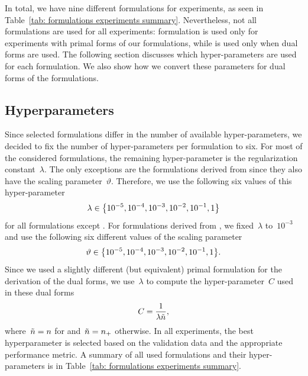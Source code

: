 In total, we have nine different formulations for experiments, as seen in Table~\ref{tab: formulations experiments summary}. Nevertheless, not all formulations are used for all experiments: \BaseLine formulation is used only for experiments with primal forms of our formulations, while \SVM is used only when dual forms are used. The following section discusses which hyper-parameters are used for each formulation. We also show how we convert these parameters for dual forms of the formulations.

\pagebreak

\subsection{Hyperparameters}

Since selected formulations differ in the number of available hyper-parameters, we decided to fix the number of hyper-parameters per formulation to six. For most of the considered formulations, the remaining hyper-parameter is the regularization constant~$\lambda$. The only exceptions are the formulations derived from \PatMatNP since they also have the scaling parameter~$\vartheta.$ Therefore, we use the following six values of this hyper-parameter
\begin{equation*}
  \lambda \in \Brac[c]{10^{-5}, 10^{-4}, 10^{-3}, 10^{-2}, 10^{-1}, 1}
\end{equation*}
for all formulations except \PatMatNP. For formulations derived from \PatMatNP, we fixed~$\lambda$ to~$10^{-3}$ and use the following six different values of the scaling parameter
\begin{equation*}
  \vartheta \in \Brac[c]{10^{-5}, 10^{-4}, 10^{-3}, 10^{-2}, 10^{-1}, 1}.
\end{equation*}
Since we used a slightly different (but equivalent) primal formulation for the derivation of the dual forms, we use~$\lambda$ to compute the hyper-parameter~$C$ used in these dual forms
\begin{equation*}
  C = \frac{1}{\lambda \tilde{n}},
\end{equation*}
where~$\tilde{n} = n$ for \SVM and~$\tilde{n} = n_{+}$ otherwise. In all experiments, the best hyperparameter is selected based on the validation data and the appropriate performance metric. A summary of all used formulations and their hyper-parameters is in Table~\ref{tab: formulations experiments summary}.

